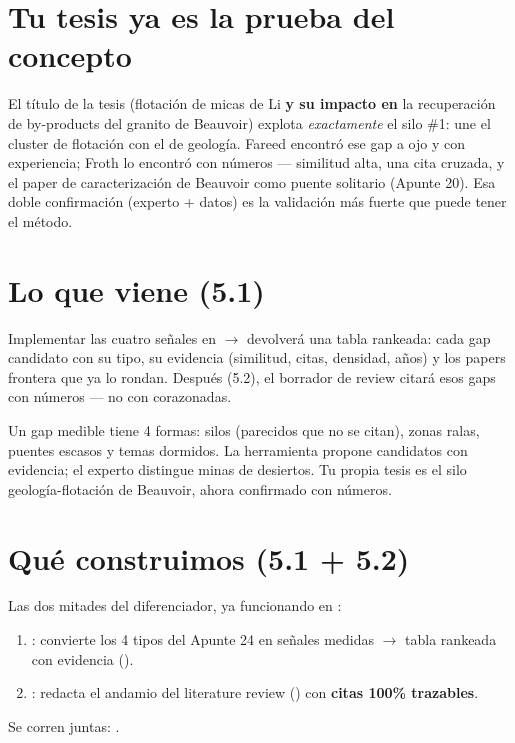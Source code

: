 \documentclass[11pt,a4paper]{article}
\begin{document}
\section{Tu tesis ya es la prueba del concepto}

El título de la tesis (flotación de micas de Li \textbf{y su impacto en} la recuperación de
by-products del granito de Beauvoir) explota \emph{exactamente} el silo \#1: une el cluster
de flotación con el de geología. Fareed encontró ese gap a ojo y con experiencia; Froth lo
encontró con números — similitud alta, una cita cruzada, y el paper de caracterización de
Beauvoir como puente solitario (Apunte 20). Esa doble confirmación (experto + datos) es la
validación más fuerte que puede tener el método.

\section{Lo que viene (5.1)}

Implementar las cuatro señales en  $\rightarrow$ 
devolverá una tabla rankeada: cada gap candidato con su tipo, su evidencia (similitud, citas,
densidad, años) y los papers frontera que ya lo rondan. Después (5.2), el borrador de review
citará esos gaps con números — no con corazonadas.

\begin{resumen}
Un gap medible tiene 4 formas: silos (parecidos que no se citan), zonas ralas, puentes
escasos y temas dormidos. La herramienta propone candidatos con evidencia; el experto
distingue minas de desiertos. Tu propia tesis es el silo geología-flotación de Beauvoir,
ahora confirmado con números.
\end{resumen}
\clearpage
{}
{}

\section{Qué construimos (5.1 + 5.2)}

Las dos mitades del diferenciador, ya funcionando en :
\begin{enumerate}
  \item {}: convierte los 4 tipos del Apunte 24 en señales medidas
        $\rightarrow$ tabla rankeada con evidencia ().
  \item {}: redacta el andamio del literature review
        () con \textbf{citas 100\% trazables}.
\end{enumerate}
Se corren juntas: .
\end{document}
